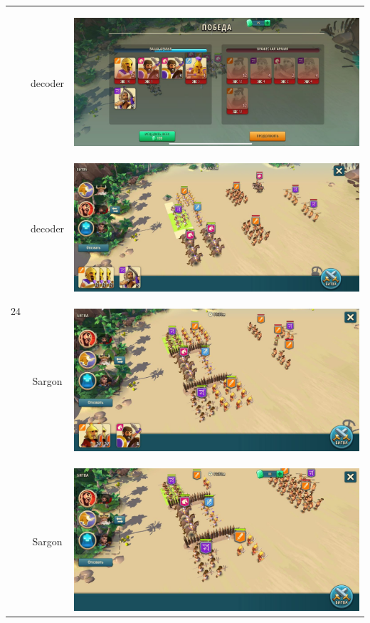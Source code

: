 \begin{longtable}{|c|c|c|}
	\hline
	\multirow{4}{*}{24} & decoder &
	\hypertarget{fight24}{\includegraphics[width=0.75\linewidth]{./parts/media/TreasureHunt/24/decoder/photo_2022-04-06_18-10-13.jpg}} \\
	& decoder &
	\includegraphics[width=0.75\linewidth]{./parts/media/TreasureHunt/24/decoder/photo_2022-04-06_18-10-02.jpg} \\
	\hline
	\multirow{11}{*}{25} & Sargon &
	\hypertarget{fight25}{\includegraphics[width=0.75\linewidth]{./parts/media/TreasureHunt/25/sargon/photo_2022-04-07_09-58-16.jpg}} \\
	& Sargon &
	\includegraphics[width=0.75\linewidth]{./parts/media/TreasureHunt/25/sargon/photo_2022-04-07_09-58-31.jpg} \\

\end{longtable}
